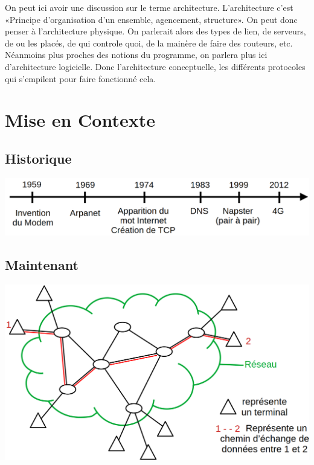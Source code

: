 
\begin{com}
	On peut ici avoir une discussion sur le terme architecture. L'architecture c'est «Principe d'organisation d'un ensemble, agencement, structure». On peut donc penser à l'architecture physique. On parlerait alors des types de lien, de serveurs, de ou les placés, de qui controle quoi, de la mainère de faire des routeurs, etc. Néanmoins plus proches des notions du programme, on parlera plus ici d'architecture logicielle. Donc l'architecture conceptuelle, les différents protocoles qui s'empilent pour faire fonctionné cela. 
\end{com}

\section{Mise en Contexte}

\subsection{Historique}

\includegraphics[width=\linewidth]{lecon/26-architecture-internet/frise.png}

\subsection{Maintenant}

\includegraphics[width=\linewidth]{lecon/26-architecture-internet/chemin_reseau.png}

